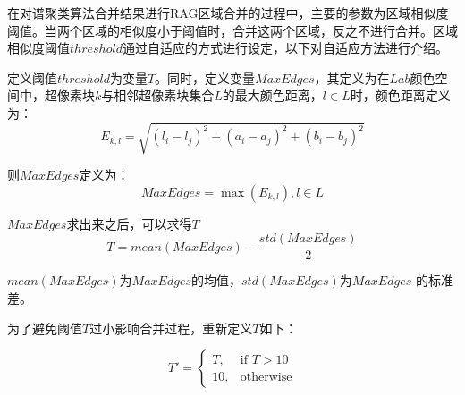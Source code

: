 在对谱聚类算法合并结果进行RAG区域合并的过程中，主要的参数为区域相似度阈值。当两个区域的相似度小于阈值时，合并这两个区域，反之不进行合并。区域相似度阈值$threshold$通过自适应的方式进行设定，以下对自适应方法进行介绍。

定义阈值$threshold$为变量$T$。同时，定义变量$MaxEdges$，其定义为在$Lab$颜色空间中，超像素块$k$与相邻超像素块集合$L$的最大颜色距离，$l\in L$时，颜色距离定义为：
$$
E_{k,l}=\sqrt{(l_i-l_j)^2+(a_i-a_j)^2+(b_i-b_j)^2}
$$

则$MaxEdges$定义为：
$$
MaxEdges=\max{(E_{k,l}),l\in L}
$$

$MaxEdges$求出来之后，可以求得$T$
$$
T=mean{(MaxEdges)}-\frac{std(MaxEdges)}{2}
$$

$mean(MaxEdges)$为$MaxEdges$的均值，$std(MaxEdges)$为$MaxEdges$ 的标准差。

为了避免阈值$T$过小影响合并过程，重新定义$T$如下：

\begin{displaymath}
T' = \left\{ \begin{array}{ll}

T, & \textrm{if $T>10$}\\
10, & \textrm{otherwise}

\end{array} \right.
\end{displaymath}

